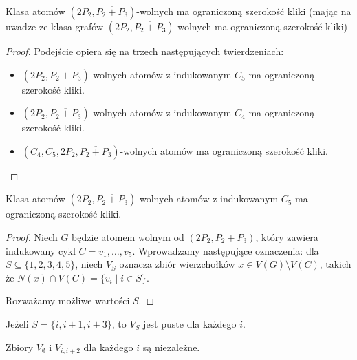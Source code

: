 \documentclass[polish]{beamer}
\begin{document}
\begin{frame}
    \begin{theorem}
        Klasa atomów $(2P_2, \overline{P_2 + P_3})$-wolnych ma ograniczoną szerokość kliki (mając na uwadze ze klasa grafów $(2P_2, \overline{P_2 + P_3})$-wolnych ma ograniczoną szerokość kliki)
    \end{theorem}
    \begin{proof}
        \renewcommand{\qedsymbol}{}
        Podejście opiera się na trzech następujących twierdzeniach:
        \begin{itemize}
            \item $(2P_2, \overline{P_2 + P_3})$-wolnych atomów z indukowanym $C_5$ ma ograniczoną szerokość kliki.
            \item $(2P_2, \overline{P_2 + P_3})$-wolnych atomów z indukowanym $C_4$ ma ograniczoną szerokość kliki.
            \item $(C_4, C_5, 2P_2, \overline{P_2 + P_3})$-wolnych atomów ma ograniczoną szerokość kliki.
        \end{itemize}
    \end{proof}
\end{frame}

\begin{frame}
    \begin{lemma}
        Klasa atomów $(2P_2, \overline{P_2 + P_3})$-wolnych atomów z indukowanym $C_5$ ma ograniczoną szerokość kliki.
    \end{lemma}
    \begin{proof}
        Niech $G$ będzie atomem wolnym od $(2P_2, P_2 + P_3)$, który zawiera indukowany cykl $C = v_1, \dots, v_5$. Wprowadzamy następujące oznaczenia: dla $S \subseteq \{1, 2, 3, 4, 5\}$, niech $V_S$ oznacza zbiór wierzchołków $x \in V(G) \setminus V(C)$, takich że $N(x) \cap V(C) = \{v_i \mid i \in S\}$.
        
        Rozważamy możliwe wartości $S$.
    \end{proof}
\end{frame}

\begin{frame}
    \begin{theorem}
        \renewcommand{\qedsymbol}{}
        Jeżeli $S = \{i, i+1, i+3\}$, to $V_S$ jest puste dla każdego $i$.
    \end{theorem}
    \graphBigger
\end{frame}

\begin{frame}
    \begin{theorem}
        \renewcommand{\qedsymbol}{}
        Zbiory $V_\emptyset$ i $V_{i,i+2}$ dla każdego $i$ są niezależne.
    \end{theorem}
    \graphBigger
\end{frame}
\end{document}
